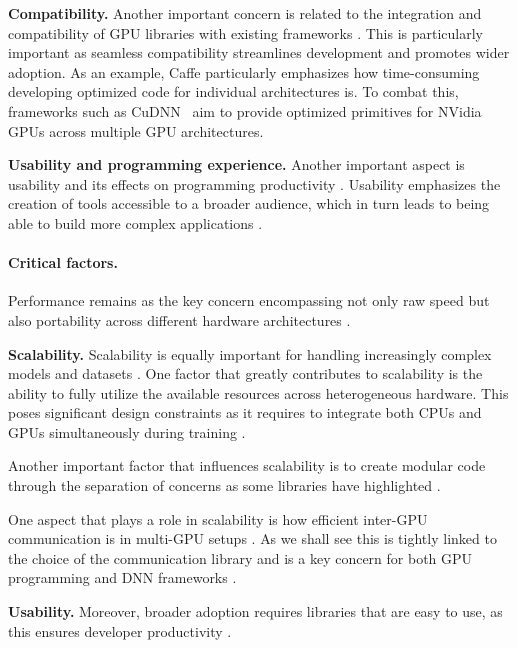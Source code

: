 \textbf{Compatibility.}
Another important concern is related to the integration and compatibility of GPU libraries with
existing frameworks . This is particularly important as seamless
compatibility streamlines development and promotes wider adoption. As an example, Caffe \cite{Jia.EtAl_2014a}
particularly emphasizes how time-consuming developing optimized code for individual architectures is.
To combat this, frameworks such as CuDNN~\cite{chetlur_cudnn_2014} aim to provide optimized primitives
for NVidia GPUs across multiple GPU architectures.

\textbf{Usability and programming experience.}
Another important aspect is usability and its effects on programming productivity .
Usability emphasizes the creation of tools accessible to a broader audience, which in turn leads to
being able to build more complex applications .

\paragraph{Critical factors.}
Performance remains as the key concern encompassing not only raw speed but also portability across
different hardware architectures .

\textbf{Scalability.}
Scalability is equally important for handling increasingly complex models and datasets .
One factor that greatly contributes to scalability is the ability to fully utilize the available resources
across heterogeneous hardware. This poses significant design constraints as it requires to integrate
both CPUs and GPUs simultaneously during training .

Another important factor that influences scalability is to create modular code through the
separation of concerns as some libraries have highlighted .

One aspect that plays a role in scalability is how efficient inter-GPU communication is in
multi-GPU setups . As we shall see this is tightly linked to the choice of the
communication library and is a key concern for both GPU programming and DNN frameworks
\cite{noauthor_uxlfoundationoneccl_2025,noauthor_nvidianccl_2025,noauthor_rocmrccl_2025}.

\textbf{Usability.}
Moreover, broader adoption requires libraries that are easy to use, as this ensures developer productivity
.

